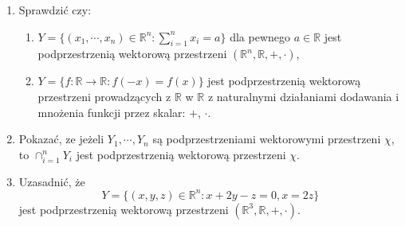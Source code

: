 \documentclass{article}
\begin{document}
\begin{enumerate}
\begin{enumerate}
                \begin{itemize}
                    \item $+$ - naturalne dodawanie wielomianów,
                    \item $\cdot$ - naturalne mnożenie wielomianu przez skalar
                \end{itemize}
             \item $X = \mathbb{R}$, $F = \mathbb{C}$ oraz:
                \begin{itemize}
                    \item $+ : X \times X \ni ( x, y) \rightarrow ( x + y) \in X  $,
                    \item $\cdot : F \times X \ni (\alpha, x) \rightarrow \alpha x \in F  $
                \end{itemize}
            \item $F = \mathbb{R}$, $X = \{ f: \mathbb{R} \rightarrow \mathbb{R}: f(-x) = f(x) \} $ oraz:
                \begin{itemize}
                    \item $+$ - naturalne dodawanie funkcji,
                    \item $\cdot$ - naturalne mnożenie funkcji przez skalar.
                \end{itemize}
        \end{enumerate}
        
    \item  Sprawdzić czy:
        \begin{enumerate}
            \item $Y = \{ (x_{1}, \cdots, x_{n}) \in \mathbb{R}^{n}: \sum_{i=1}^{n}x_{i} = a \}$ dla pewnego $a \in \mathbb{R}$ jest podprzestrzenią wektorową przestrzeni $(\mathbb{R}^{n}, \mathbb{R}, +, \cdot)$,
            \item $Y = \{ f: \mathbb{R} \rightarrow \mathbb{R}: f(-x) = f(x) \}$ jest podprzestrzenią wektorową przestrzeni prowadzących z $\mathbb{R}$ w $\mathbb{R}$ z naturalnymi działaniami dodawania i mnożenia funkcji przez skalar: $+$, $\cdot$.
        \end{enumerate}

    \item  Pokazać, ze jeżeli $Y_{1}, \cdots, Y_{n}$ są podprzestrzeniami wektorowymi przestrzeni $\chi$, to $\cap_{i=1}^{n} Y_{i}$ jest podprzestrzenią wektorową przestrzeni $\chi$.

    \item Uzasadnić, że
    $$
        Y = \{ (x, y, z) \in \mathbb{R}^{n}: x + 2y -z = 0, x = 2z \}
    $$
    jest podprzestrzenią wektorową przestrzeni $(\mathbb{R}^{3}, \mathbb{R}, +, \cdot)$.


\end{enumerate}
\end{document}
